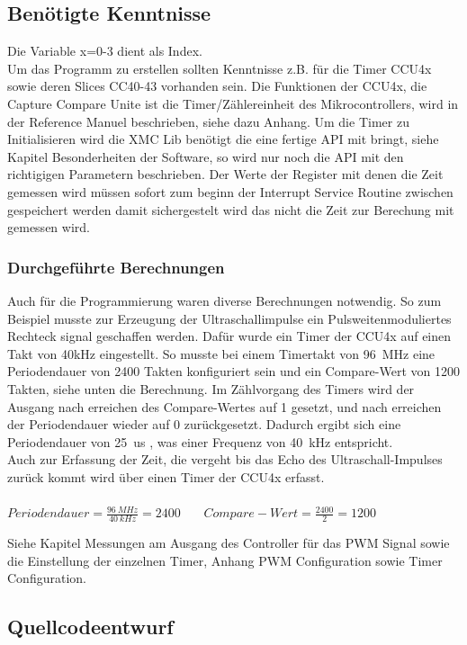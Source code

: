 \subsection{Benötigte Kenntnisse}
Die Variable x=0-3 dient als Index.\\
Um das Programm zu erstellen sollten Kenntnisse z.B. für die Timer CCU4x sowie deren Slices CC40-43 vorhanden sein. Die Funktionen der CCU4x, die Capture Compare Unite ist die Timer/Zählereinheit des Mikrocontrollers, wird in der Reference Manuel beschrieben, siehe dazu Anhang. Um die Timer zu Initialisieren wird die XMC Lib benötigt die eine fertige API mit bringt, siehe Kapitel Besonderheiten der Software, so wird nur noch die API mit den richtigigen Parametern beschrieben. Der Werte der Register mit denen die Zeit gemessen wird müssen sofort zum beginn der Interrupt Service Routine zwischen gespeichert werden damit sichergestelt wird das nicht die Zeit zur Berechung mit gemessen wird.\\

\subsubsection{Durchgeführte Berechnungen}
Auch für die Programmierung waren diverse Berechnungen notwendig. So zum Beispiel musste zur Erzeugung der Ultraschallimpulse ein Pulsweitenmoduliertes Rechteck signal geschaffen werden. Dafür wurde ein Timer der CCU4x auf einen Takt von 40kHz eingestellt. So musste bei einem Timertakt von 96~MHz eine Periodendauer von 2400 Takten konfiguriert sein und ein Compare-Wert von 1200 Takten, siehe unten die Berechnung. Im Zählvorgang des Timers wird der Ausgang nach erreichen des Compare-Wertes auf 1 gesetzt, und nach erreichen der Periodendauer wieder auf 0 zurückgesetzt. Dadurch ergibt sich eine Periodendauer von 25~us , was einer Frequenz von 40~kHz entspricht.\\
Auch zur Erfassung der Zeit, die vergeht bis das Echo des Ultraschall-Impulses zurück kommt wird über einen Timer der CCU4x erfasst. 
\onehalfspacing \\ \\
\(\displaystyle Periodendauer=\frac{96~MHz}{40~kHz} = 2400 \)  \  \  \    \(\displaystyle Compare-Wert=\frac{2400}{2} = 1200 \) 
\singlespacing

Siehe Kapitel Messungen am Ausgang des Controller für das PWM Signal sowie die Einstellung der einzelnen Timer, Anhang PWM Configuration sowie Timer Configuration.

\subsection{Quellcodeentwurf}

